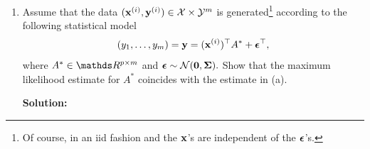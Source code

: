 \documentclass[a4paper]{article}
\begin{document}
{\begin{enumerate}
	$$	\hat{A} = (\hat{\ba}_1 ~ \ldots ~ \hat{\ba}_m) = \left(	(\Xmat^\top \Xmat)^{-1} \Xmat^\top \bm{y}_1 ~ \ldots ~ (\Xmat^\top \Xmat)^{-1} \Xmat^\top \bm{y}_m		\right) = (\Xmat^\top \Xmat)^{-1} \Xmat^\top Y.	$$
	In particular, the gradient of $f$ w.r.t.\ matrix $A=(\ba_1 ~ \ldots ~ \ba_m)$ is 
	\begin{align*}
		\nabla f(A) 	
		&= ( \nabla f_1(\ba_1) ~ \ldots ~ \nabla f_m(\ba_m) )  \\
		&= \left( - 2 \bm{y}_1^\top \Xmat  + 2 \Xmat^\top  \Xmat \bm{a}_1 \quad \ldots \quad - 2 \bm{y}_m^\top \Xmat  + 2 \Xmat^\top  \Xmat \bm{a}_m\right) \\
		&= -2Y^\top \Xmat  + 2 \Xmat^\top  \Xmat A.
	\end{align*}
	Hence, a gradient descent routine with (fixed) step size $\alpha$ for $f$ would iterate as follows:
	\begin{align*}	
		\hat A \leftarrow \hat A - 2 \alpha \left( -Y^\top \Xmat  +  \Xmat^\top  \Xmat \hat A \right).	
	\end{align*}
	\item Assume that the data $(\mathbf{x}^{(i)},\mathbf{y}^{(i)}) \in \mathcal{X} \times \mathcal{Y}^m$ is generated\footnote{Of course, in an iid fashion and the $\mathbf{x}$'s are independent of the $\bm{\epsilon}$'s.} according to the following statistical model
	$$	(y_1,\ldots,y_m) =	\mathbf{y} = (\mathbf{x}^{(i)})^\top A^* + \bm{\epsilon}^\top,		$$
	where $A^* \in \R^{p\times m}$ and $\bm{\epsilon} \sim \mathcal{N}(\bm{0},\bm{\Sigma}).$
	Show that the maximum likelihood estimate for $A^*$ coincides with the estimate in (a). 
	
	\textbf{Solution:}
	

\end{enumerate}}
\end{document}

